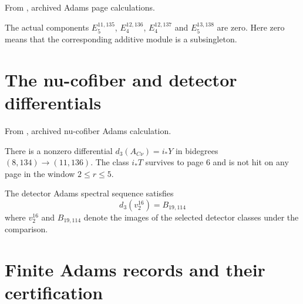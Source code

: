 \begin{theorem}
\label{sem:Computation:higher-page-vanishing}
From \cite{LinProgram}, archived Adams page calculations.\par
The actual components $E_5^{11,135}$, $E_4^{12,136}$, $E_4^{12,137}$ and $E_5^{13,138}$ are zero. Here zero means that the corresponding additive module is a subsingleton.
\end{theorem}

\section{The nu-cofiber and detector differentials}

\begin{theorem}
\label{sem:Computation:cofiber-results}
From \cite{LinProgram}, archived nu-cofiber Adams calculation.\par
There is a nonzero differential $d_3(A_{C\nu})=i_*Y$ in bidegrees $(8,134)\to(11,136)$. The class $i_*T$ survives to page $6$ and is not hit on any page in the window $2\leq r\leq5$.
\end{theorem}

\begin{theorem}
\label{sem:Computation:detector-differential}
The detector Adams spectral sequence satisfies
\[d_3(v_2^{16})=B_{19,114}\]
where $v_2^{16}$ and $B_{19,114}$ denote the images of the selected detector classes under the comparison.
\end{theorem}

\section{Finite Adams records and their certification}

